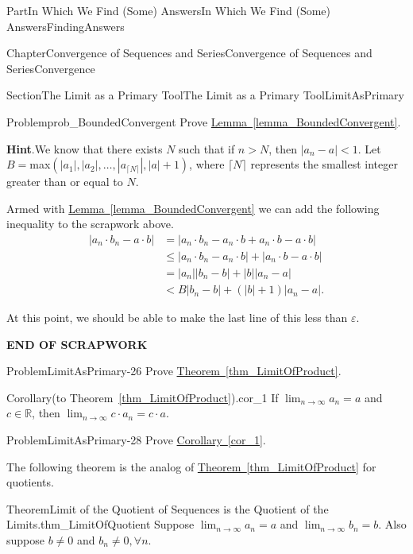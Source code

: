 \documentclass[oneside,10pt,]{book}
\newcommand{\blocktitlefont}{\relax}
\newcommand{\xreffont}{\relax}
\newcommand{\terminology}[1]{\textbf{#1}}
\numberwithin{equation}{part}
\newcommand{\abs}[1]{\left|#1\right|}
\def\limit#1#2#3{{\displaystyle\lim_{#1\rightarrow #2}#3}}
\def\limitt#1#2#3{{\displaystyle\lim_{#1\rightarrow #2}\textstyle #3}}
\newcommand{\eps}{\varepsilon}
\newcommand{\lt}{<}
\newcommand{\amp}{&}
\begin{document}
\begin{partptx}{Part}{In Which We Find (Some) Answers}{}{In Which We Find (Some) Answers}{}{}{FindingAnswers}
\begin{chapterptx}{Chapter}{Convergence of Sequences and Series}{}{Convergence of Sequences and Series}{}{}{Convergence}
\begin{sectionptx}{Section}{The Limit as a Primary Tool}{}{The Limit as a Primary Tool}{}{}{LimitAsPrimary}
\begin{problem}{Problem}{}{prob_BoundedConvergent}
Prove \hyperref[lemma_BoundedConvergent]{Lemma~{\xreffont\ref{lemma_BoundedConvergent}}}.%
\par\smallskip%
\noindent\textbf{\blocktitlefont Hint}.\hypertarget{prob_BoundedConvergent-3}{}\quad{}We know that there exists \(N\) such that if \(n>N\), then \(\abs{a_n-a}\lt 1\).  Let \(B=\)max\(\left(\abs{a_1},\abs{a_2},\ldots,\abs{a_{\lceil{N}\rceil}},\abs{a}+1\right)\), where \(\lceil{N}\rceil\) represents the smallest integer greater than or equal to \(N\).%
\end{problem}
Armed with \hyperref[lemma_BoundedConvergent]{Lemma~{\xreffont\ref{lemma_BoundedConvergent}}} we can add the following inequality to the scrapwork above.%
\begin{align*}
\abs{a_n\cdot b_n-a\cdot b}\amp =\abs{a_n\cdot b_n-a_n\cdot b+a_n\cdot b-a\cdot b}\\
\amp \leq \abs{a_n\cdot b_n-a_n\cdot b}+ \abs{a_n\cdot b-a\cdot b}\\
\amp = \abs{a_n}\abs{b_n-b}+\abs{b}\abs{a_n-a}\\
\amp \lt B \abs{b_n-b}+\left(\abs{b}+1\right)\abs{a_n-a}.
\end{align*}
%
\par
At this point, we should be able to make the last line of this less than \(\eps\).%
\par
\terminology{END OF SCRAPWORK}%
\begin{problem}{Problem}{}{LimitAsPrimary-26}%
Prove \hyperref[thm_LimitOfProduct]{Theorem~{\xreffont\ref{thm_LimitOfProduct}}}.%
\end{problem}
\begin{corollary}{Corollary}{(to Theorem~{\xreffont\ref*{thm_LimitOfProduct}}).}{}{cor_1}%
If \(\limit{n}{\infty}{a_n}=a\) and \(c\in\mathbb{R}\), then \(\limit{n}{\infty}{c\cdot a_n}=c\cdot a\).%
\end{corollary}
\begin{problem}{Problem}{}{LimitAsPrimary-28}%
Prove  \hyperref[cor_1]{Corollary~{\xreffont\ref{cor_1}}}.%
\end{problem}
The following theorem is the analog of \hyperref[thm_LimitOfProduct]{Theorem~{\xreffont\ref{thm_LimitOfProduct}}} for quotients.%
\begin{theorem}{Theorem}{Limit of the Quotient of Sequences is the Quotient of the Limits.}{}{thm_LimitOfQuotient}%
%
Suppose \(\limitt{n}{\infty}{a_n}=a\) and \(\limitt{n}{\infty}{b_n}=b\). Also suppose \(b\neq 0\) and \(b_n\neq 0, \forall n\).%
\par

\end{theorem}
\end{sectionptx}
\end{chapterptx}
\end{partptx}
\end{document}
